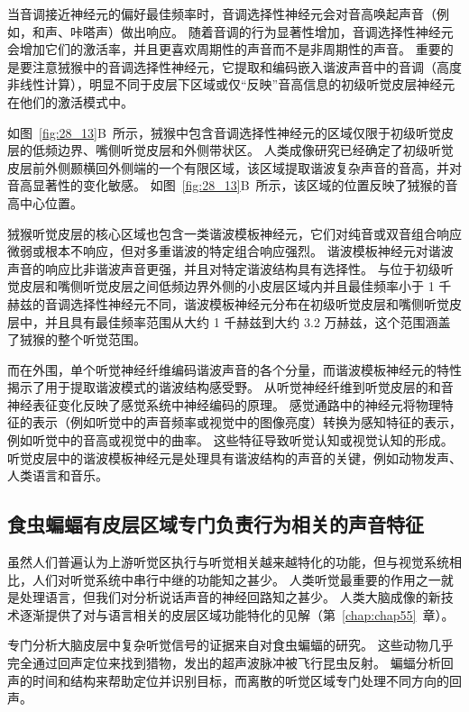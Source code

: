 当音调接近神经元的偏好最佳频率时，音调选择性神经元会对音高唤起声音（例如，和声、咔嗒声）做出响应。
随着音调的行为显著性增加，音调选择性神经元会增加它们的激活率，并且更喜欢周期性的声音而不是非周期性的声音。
重要的是要注意狨猴中的音调选择性神经元，它提取和编码嵌入谐波声音中的音调（高度非线性计算），明显不同于皮层下区域或仅“反映”音高信息的初级听觉皮层神经元在他们的激活模式中。


如图~\ref{fig:28_13}B~所示，狨猴中包含音调选择性神经元的区域仅限于初级听觉皮层的低频边界、嘴侧听觉皮层和外侧带状区。
人类成像研究已经确定了初级听觉皮层前外侧颞横回外侧端的一个有限区域，该区域提取谐波复杂声音的音高，并对音高显著性的变化敏感。
如图~\ref{fig:28_13}B~所示，该区域的位置反映了狨猴的音高中心位置。


狨猴听觉皮层的核心区域也包含一类谐波模板神经元，它们对纯音或双音组合响应微弱或根本不响应，但对多重谐波的特定组合响应强烈。
谐波模板神经元对谐波声音的响应比非谐波声音更强，并且对特定谐波结构具有选择性。
与位于初级听觉皮层和嘴侧听觉皮层之间低频边界外侧的小皮层区域内并且最佳频率小于 1 千赫兹的音调选择性神经元不同，谐波模板神经元分布在初级听觉皮层和嘴侧听觉皮层中，并且具有最佳频率范围从大约 1 千赫兹到大约 3.2 万赫兹，这个范围涵盖了狨猴的整个听觉范围。


而在外围，单个听觉神经纤维编码谐波声音的各个分量，而谐波模板神经元的特性揭示了用于提取谐波模式的谐波结构感受野。
从听觉神经纤维到听觉皮层的和音神经表征变化反映了感觉系统中神经编码的原理。
感觉通路中的神经元将物理特征的表示（例如听觉中的声音频率或视觉中的图像亮度）转换为感知特征的表示，例如听觉中的音高或视觉中的曲率。
这些特征导致听觉认知或视觉认知的形成。
听觉皮层中的谐波模板神经元是处理具有谐波结构的声音的关键，例如动物发声、人类语言和音乐。



\subsection{食虫蝙蝠有皮层区域专门负责行为相关的声音特征}

虽然人们普遍认为上游听觉区执行与听觉相关越来越特化的功能，但与视觉系统相比，人们对听觉系统中串行中继的功能知之甚少。
人类听觉最重要的作用之一就是处理语言，但我们对分析说话声音的神经回路知之甚少。
人类大脑成像的新技术逐渐提供了对与语言相关的皮层区域功能特化的见解（第~\ref{chap:chap55}~章）。


专门分析大脑皮层中复杂听觉信号的证据来自对食虫蝙蝠的研究。
这些动物几乎完全通过回声定位来找到猎物，发出的超声波脉冲被飞行昆虫反射。
蝙蝠分析回声的时间和结构来帮助定位并识别目标，而离散的听觉区域专门处理不同方向的回声。


